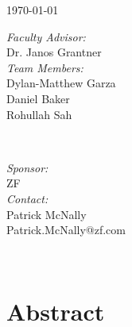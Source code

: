 \documentclass[12pt]{article}
\begin{document}
\begin{titlepage}
    {\large \today}\\[1cm] 
    
    
    \begin{minipage}{0.4\textwidth}
        \begin{flushleft} \large
            \emph{Faculty Advisor:}\\
            Dr. Janos Grantner\\ [.25cm]
        \emph{Team Members:}\\
        Dylan-Matthew Garza\\
        Daniel Baker\\
        Rohullah Sah
        \end{flushleft}
    \end{minipage}
    ~
    \begin{minipage}{0.4\textwidth}
        \begin{flushright} \large
            \emph{Sponsor:} \\
            ZF
            \\\emph{Contact:}\\
            Patrick McNally\\ 
            Patrick.McNally@zf.com
        \end{flushright}
    \end{minipage}\\[1cm]
    
    
    \begin{flushleft} \large
    \end{flushleft}
    
    \vfill 
    
\end{titlepage}

\tableofcontents
\newpage
\doublespacing


\section{Abstract}
\end{document}
